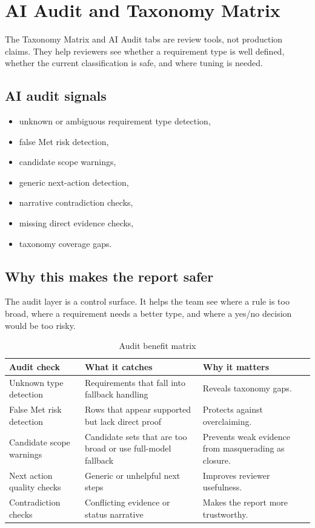 \documentclass[10pt,letterpaper]{article}
\begin{document}
\section{AI Audit and Taxonomy Matrix}

The Taxonomy Matrix and AI Audit tabs are review tools, not production claims. They help reviewers see whether a requirement type is well defined, whether the current classification is safe, and where tuning is needed.

\subsection{AI audit signals}

\begin{itemize}
  \item unknown or ambiguous requirement type detection,
  \item false Met risk detection,
  \item candidate scope warnings,
  \item generic next-action detection,
  \item narrative contradiction checks,
  \item missing direct evidence checks,
  \item taxonomy coverage gaps.
\end{itemize}

\subsection{Why this makes the report safer}

The audit layer is a control surface. It helps the team see where a rule is too broad, where a requirement needs a better type, and where a yes/no decision would be too risky.

\begin{longtable}{p{1.55in}p{2.5in}p{2.35in}}
\caption{Audit benefit matrix}\\
\toprule
\textbf{Audit check} & \textbf{What it catches} & \textbf{Why it matters} \\
\midrule
\endhead
Unknown type detection & Requirements that fall into fallback handling & Reveals taxonomy gaps. \\
False Met risk detection & Rows that appear supported but lack direct proof & Protects against overclaiming. \\
Candidate scope warnings & Candidate sets that are too broad or use full-model fallback & Prevents weak evidence from masquerading as closure. \\
Next action quality checks & Generic or unhelpful next steps & Improves reviewer usefulness. \\
Contradiction checks & Conflicting evidence or status narrative & Makes the report more trustworthy. \\
\bottomrule
\end{longtable}
\end{document}
